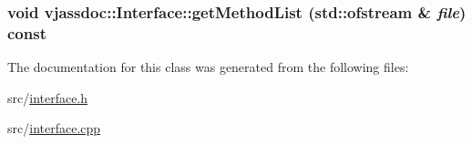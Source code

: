 \hypertarget{classvjassdoc_1_1Interface_055d23bf3a4010668e3a656ea00c9f1e}{
\subsubsection{\setlength{\rightskip}{0pt plus 5cm}void vjassdoc::Interface::getMethodList (std::ofstream \& {\em file}) const}}
\label{classvjassdoc_1_1Interface_055d23bf3a4010668e3a656ea00c9f1e}




The documentation for this class was generated from the following files:\begin{CompactItemize}
\item 
src/\hyperlink{interface_8h}{interface.h}\item 
src/\hyperlink{interface_8cpp}{interface.cpp}\end{CompactItemize}
